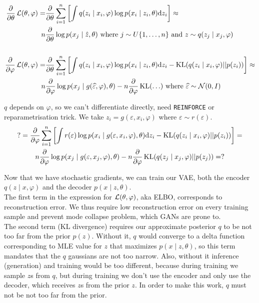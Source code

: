\begin{equation*}
    \begin{aligned}
        \pdv{\theta}\operatorname{\mathcal{L}}(\theta, \varphi) =
        &\pdv{\theta} \sum_{i=1}^{n} \left[ \int q(z_i \mid x_i, \varphi) \log p(x_i \mid z_i, \theta) \dd z_i \right]
        \approx \\
        n &\pdv{\theta} \log p(x_j \mid \hat{z}, \theta)
        \text{ where } j \sim U \{1, \ldots, n\} \text{ and } z \sim q(z_j \mid x_j, \varphi) \\ 
        \\
        \pdv{\varphi}\operatorname{\mathcal{L}}(\theta, \varphi) =
        &\pdv{\theta} \sum_{i=1}^{n} \left[
            \int q(z_i \mid x_i, \varphi) \log p(x_i \mid z_i, \theta) \dd z_i
            -\operatorname{KL}(q(z_i \mid x_i, \varphi) || p(z_i))
        \right] \approx \\ 
        n &\pdv{\varphi} \log p(x_j \mid g(\widehat{\varepsilon}, \varphi), \theta) - n \pdv{\varphi} \operatorname{KL}( \ldots ) \text{ where } \widehat{\varepsilon} \sim \operatorname{\mathcal{N}}(0, I)
    \end{aligned}
\end{equation*}

$q$ depends on $\varphi$, so we can't differentiate directly, need \texttt{REINFORCE} or reparametrisation trick.
We take $z_i = g(\varepsilon, x_i, \varphi)$ where $\varepsilon \sim r(\varepsilon)$.
    \begin{multline*}
    ? = \pdv{\varphi} \sum_{i=1}^{n} \left[
        \int r(\varepsilon) \log p(x_i \mid g(\varepsilon, x_i, \varphi), \theta) \dd z_i
        -\operatorname{KL}(q(z_i \mid x_i, \varphi) || p(z_i))
    \right] =\\ n \pdv{\varphi} \log p(x_j \mid g(\varepsilon, x_j, \varphi), \theta) 
    - n \pdv{\varphi} \operatorname{KL}(q(z_j \mid x_j, \varphi) || p(z_j)) = ? 
\end{multline*}

Now that we have stochastic gradients, we can train our VAE, both the encoder $q(z \mid x, \varphi)$ and the decoder $p(x \mid z, \theta)$. \\ 

The first term in the expression for $\operatorname{\mathcal{L}}(\theta, \varphi)$, aka ELBO, corresponds to reconstruction error.
We thus require low reconstruction error on every training sample and prevent mode collapse problem, which GANs are prone to. \\ 

The second term (KL divergence) requires our approximate posterior $q$ to be not too far from the prior $p(z)$.
Without it, $q$ would converge to a delta function corresponding to MLE value for $z$ that maximizes $p(x\mid z, \theta)$, so this term mandates that the $q$ gaussians are not too narrow.
Also, without it inference (generation) and training would be too different, because during training we sample $z$s from $q$, but during training we don't use the encoder and only use the decoder, which receives $z$s from the prior $z$. 
In order to make this work, $q$ must not be not too far from the prior. \\ 

